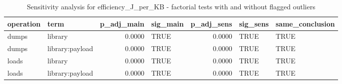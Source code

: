 \begin{table}[ht]
\centering
\begin{tabular}{llrlrll}
  \toprule
operation & term & p\_adj\_main & sig\_main & p\_adj\_sens & sig\_sens & same\_conclusion \\ 
  \midrule
dumps & library & 0.0000 & TRUE & 0.0000 & TRUE & TRUE \\ 
  dumps & library:payload & 0.0000 & TRUE & 0.0000 & TRUE & TRUE \\ 
  loads & library & 0.0000 & TRUE & 0.0000 & TRUE & TRUE \\ 
  loads & library:payload & 0.0000 & TRUE & 0.0000 & TRUE & TRUE \\ 
   \bottomrule
\end{tabular}
\caption{Sensitivity analysis for efficiency_J_per_KB - factorial tests with and without flagged outliers} 
\label{tab:sens_RQ1_1_efficiency_anova}
\end{table}
